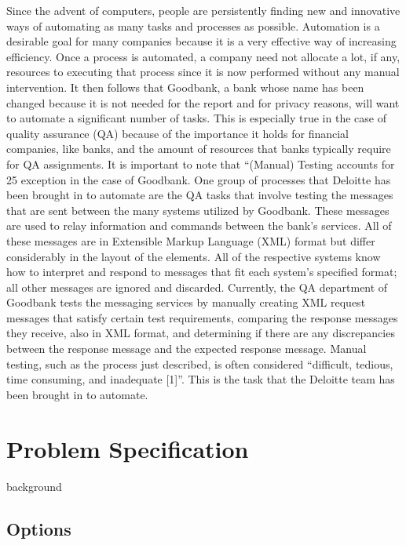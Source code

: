 \documentclass[12pt]{article}
\begin{document}
Since the advent of computers, people are persistently finding new and innovative 
ways of automating as many tasks and processes as possible. Automation is a desirable 
goal for many companies because it is a very effective way of increasing efficiency. 
Once a process is automated, a company need not allocate a lot, if any, resources to 
executing that process since it is now performed without any manual intervention. It then 
follows that Goodbank, a bank whose name has been changed because it is not needed for 
the report and for privacy reasons, will want to automate a significant number of tasks. 
This is especially true in the case of quality assurance (QA) because of the importance it 
holds for financial companies, like banks, and the amount of resources that banks 
typically require for QA assignments. It is important to note that “(Manual) Testing 
accounts for 25%
exception in the case of Goodbank. One group of processes that Deloitte has been 
brought in to automate are the QA tasks that involve testing the messages that are sent 
between the many systems utilized by Goodbank. These messages are used to relay 
information and commands between the bank’s services. All of these messages are in 
Extensible Markup Language (XML) format but differ considerably in the layout of the 
elements. All of the respective systems know how to interpret and respond to messages 
that fit each system’s specified format; all other messages are ignored and discarded. 
Currently, the QA department of Goodbank tests the messaging services by manually 
creating XML request messages that satisfy certain test requirements, comparing the 
response messages they receive, also in XML format, and determining if there are any 
discrepancies between the response message and the expected response message. Manual 
testing, such as the process just described, is often considered “difficult, tedious, time 
consuming, and inadequate [1]”. This is the task that the Deloitte team has been brought 
in to automate.



\newpage

\section{Problem Specification}
background
\subsection{Options}
\end{document}

